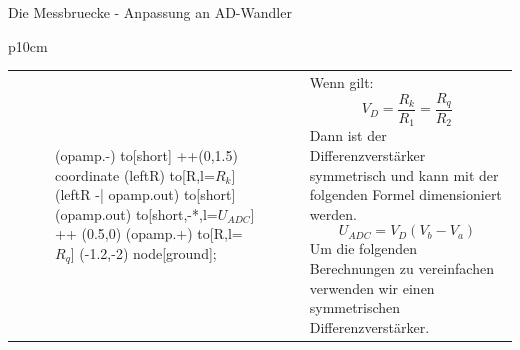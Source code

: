 \begin{frame}[t]{Die Messbruecke - Anpassung an AD-Wandler}
\begin{spacing}{0.9}
\begin{tiny}
\begin{table}[h!]
\begin{tabular}{p{10cm} }
\begin{tabular}{p{5cm} p{5cm}}
\begin{minipage}{0.5\textwidth}
\begin{figure}[h!]
{\begin{circuitikz}
                        (opamp.-) to[short] ++(0,1.5) coordinate (leftR)
                        to[R,l=$R_k$] (leftR -| opamp.out)            
                        to[short] (opamp.out) to[short,-*,l=$U_{ADC}$] ++ (0.5,0)
                        (opamp.+) to[R,l=$R_q$] (-1.2,-2) node[ground]{};
                      \end{circuitikz}
                    }
                    \end{figure}
            \end{minipage}
            &
            \begin{minipage}{0.4\textwidth}
                Wenn gilt:\newline
                \begin{equation}
                    V_{D} = \frac{R_k}{R_1} = \frac{R_q}{R_2} 
                \end{equation}
                Dann ist der Differenzverstärker symmetrisch und kann mit der folgenden Formel dimensioniert werden.\newline
                \begin{equation}
                    U_{ADC}=V_{D}(V_b-V_a)
                \end{equation}
                Um die folgenden Berechnungen zu vereinfachen verwenden wir einen symmetrischen Differenzverstärker.
            \end{minipage}
        \end{tabular}

    \end{tabular}

    \end{table}
     
    \end{tiny} \end{spacing}

\end{frame}

